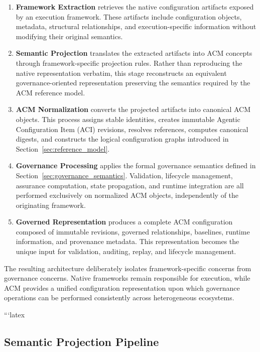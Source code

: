 \documentclass[10pt]{article}
\begin{document}
\begin{enumerate}
    \item \textbf{Framework Extraction} retrieves the native configuration artifacts exposed by an execution framework. These artifacts include configuration objects, metadata, structural relationships, and execution-specific information without modifying their original semantics.

    \item \textbf{Semantic Projection} translates the extracted artifacts into ACM concepts through framework-specific projection rules. Rather than reproducing the native representation verbatim, this stage reconstructs an equivalent governance-oriented representation preserving the semantics required by the ACM reference model.

    \item \textbf{ACM Normalization} converts the projected artifacts into canonical ACM objects. This process assigns stable identities, creates immutable Agentic Configuration Item (ACI) revisions, resolves references, computes canonical digests, and constructs the logical configuration graphs introduced in Section~\ref{sec:reference_model}.

    \item \textbf{Governance Processing} applies the formal governance semantics defined in Section~\ref{sec:governance_semantics}. Validation, lifecycle management, assurance computation, state propagation, and runtime integration are all performed exclusively on normalized ACM objects, independently of the originating framework.

    \item \textbf{Governed Representation} produces a complete ACM configuration composed of immutable revisions, governed relationships, baselines, runtime information, and provenance metadata. This representation becomes the unique input for validation, auditing, replay, and lifecycle management.
\end{enumerate}

The resulting architecture deliberately isolates framework-specific concerns from governance concerns. Native frameworks remain responsible for execution, while ACM provides a unified configuration representation upon which governance operations can be performed consistently across heterogeneous ecosystems.

```latex
\subsection{Semantic Projection Pipeline}
\label{subsec:semantic_projection_pipeline}
\end{document}
